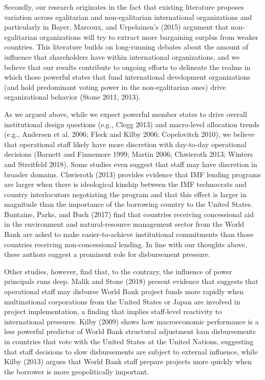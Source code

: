 \documentclass{article}
\begin{document}
Secondly, our research originates in the fact that existing literature proposes variation across egalitarian and non-egalitarian international organizations and particularly in Bayer, Marcoux, and Urpelainen’s (2015) argument that non-egalitarian organizations will try to extract more bargaining surplus from weaker countries. This literature builds on long-running debates about the amount of influence that shareholders have within international organizations, and we believe that our results contribute to ongoing efforts to delineate the realms in which those powerful states that fund international development organizations (and hold predominant voting power in the non-egalitarian ones) drive organizational behavior (Stone 2011, 2013).  

As we argued above, while we expect powerful member states to drive overall institutional design questions (e.g., Clegg 2013) and macro-level allocation trends (e.g., Andersen et al. 2006; Fleck and Kilby 2006; Copelovitch 2010), we believe that operational staff likely have more discretion with day-to-day operational decisions (Barnett and Finnemore 1999; Martin 2006; Chwieroth 2013; Winters and Streitfeld 2018). Some studies even suggest that staff may have discretion in broader domains.  Chwieroth (2013) provides evidence that IMF lending programs are larger when there is ideological kinship between the IMF technocrats and country interlocutors negotiating the program and that this effect is larger in magnitude than the importance of the borrowing country to the United States.  Buntaine, Parks, and Buch (2017) find that countries receiving concessional aid in the environment and natural-resource management sector from the World Bank are asked to make easier-to-achieve institutional commitments than those countries receiving non-concessional lending.  In line with our thoughts above, these authors suggest a prominent role for disbursement pressure.

Other studies, however, find that, to the contrary, the influence of power principals runs deep.  Malik and Stone (2018) present evidence that suggests that operational staff may disburse World Bank project funds more rapidly when multinational corporations from the United States or Japan are involved in project implementation, a finding that implies staff-level reactivity to international pressures.  Kilby (2009) shows how macroeconomic performance is a less powerful predictor of World Bank structural adjustment loan disbursements in countries that vote with the United States at the United Nations, suggesting that staff decisions to slow disbursements are subject to external influence, while Kilby (2013) argues that World Bank staff prepare projects more quickly when the borrower is more geopolitically important.
\end{document}
